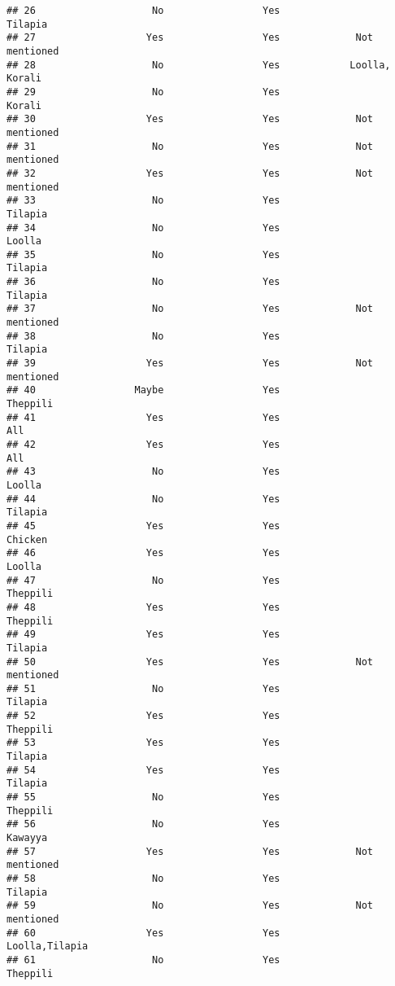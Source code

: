 \documentclass[
]{article}
\begin{document}
\begin{verbatim}
## 26                    No                 Yes                  Tilapia 
## 27                   Yes                 Yes             Not mentioned
## 28                    No                 Yes            Loolla, Korali
## 29                    No                 Yes                    Korali
## 30                   Yes                 Yes             Not mentioned
## 31                    No                 Yes             Not mentioned
## 32                   Yes                 Yes             Not mentioned
## 33                    No                 Yes                  Tilapia 
## 34                    No                 Yes                   Loolla 
## 35                    No                 Yes                  Tilapia 
## 36                    No                 Yes                  Tilapia 
## 37                    No                 Yes             Not mentioned
## 38                    No                 Yes                  Tilapia 
## 39                   Yes                 Yes             Not mentioned
## 40                 Maybe                 Yes                 Theppili 
## 41                   Yes                 Yes                       All
## 42                   Yes                 Yes                       All
## 43                    No                 Yes                   Loolla 
## 44                    No                 Yes                  Tilapia 
## 45                   Yes                 Yes                   Chicken
## 46                   Yes                 Yes                   Loolla 
## 47                    No                 Yes                 Theppili 
## 48                   Yes                 Yes                 Theppili 
## 49                   Yes                 Yes                  Tilapia 
## 50                   Yes                 Yes             Not mentioned
## 51                    No                 Yes                  Tilapia 
## 52                   Yes                 Yes                 Theppili 
## 53                   Yes                 Yes                  Tilapia 
## 54                   Yes                 Yes                  Tilapia 
## 55                    No                 Yes                 Theppili 
## 56                    No                 Yes                   Kawayya
## 57                   Yes                 Yes             Not mentioned
## 58                    No                 Yes                  Tilapia 
## 59                    No                 Yes             Not mentioned
## 60                   Yes                 Yes           Loolla,Tilapia 
## 61                    No                 Yes                 Theppili 

\end{verbatim}
\end{document}
